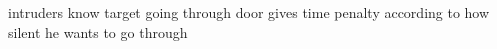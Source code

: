 	intruders know target
	going through door gives time penalty according to how silent he wants to go through
	